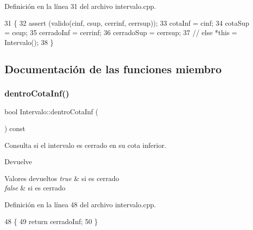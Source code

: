 Definición en la línea 31 del archivo intervalo.\+cpp.


\begin{DoxyCode}
31                                                                        \{
32   assert (valido(cinf, csup, cerrinf, cerrsup));
33     cotaInf = cinf;
34     cotaSup = csup;
35     cerradoInf = cerrinf;
36     cerradoSup = cerrsup;
37 \textcolor{comment}{//     else *this = Intervalo();}
38 \}
\end{DoxyCode}


\subsection{Documentación de las funciones miembro}
\mbox{\label{classIntervalo_aac8f7b98dd0d702086ea897f5c9ad932}} 
\subsubsection{\texorpdfstring{dentro\+Cota\+Inf()}{dentroCotaInf()}}
{\footnotesize\ttfamily bool Intervalo\+::dentro\+Cota\+Inf (\begin{DoxyParamCaption}{ }\end{DoxyParamCaption}) const}



Consulta si el intervalo es cerrado en su cota inferior. 

\begin{DoxyReturn}{Devuelve}

\end{DoxyReturn}

\begin{DoxyRetVals}{Valores devueltos}
{\em true} & si es cerrado \\
\hline
{\em false} & si es cerrado \\
\hline
\end{DoxyRetVals}


Definición en la línea 48 del archivo intervalo.\+cpp.


\begin{DoxyCode}
48                                    \{
49     \textcolor{keywordflow}{return} cerradoInf;
50 \}
\end{DoxyCode}
\mbox{\label{classIntervalo_aed0964a68d4b727bd104f5128ee7a7ef}} 
